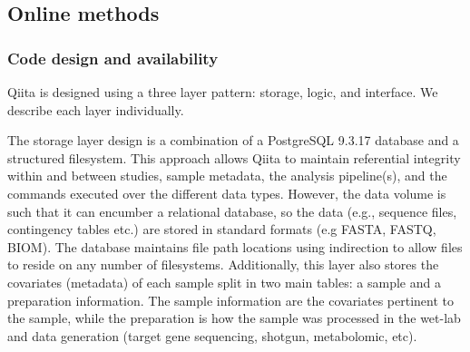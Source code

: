 \subsection{Online methods}

\subsubsection{Code design and availability}

Qiita is designed using a three layer pattern: storage, logic, and interface.
We describe each layer individually.

The storage layer design is a combination of a PostgreSQL 9.3.17 database and a
structured filesystem. This approach allows Qiita to maintain referential integrity
within and between studies, sample metadata, the analysis pipeline(s), and the
commands executed over the different data types. However, the data volume is such
that it can encumber a relational database, so the data (e.g., sequence files,
contingency tables etc.) are stored in standard formats (e.g FASTA, FASTQ, BIOM).
The database maintains file path locations using indirection to allow files to
reside on any number of filesystems. Additionally, this layer also stores the
covariates (metadata) of each sample split in two main tables: a sample and a
preparation information. The sample information are the covariates pertinent to
the sample, while the preparation is how the sample was processed in the wet-lab
and data generation (target gene sequencing, shotgun, metabolomic, etc).

